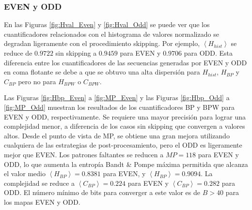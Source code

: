 \subsubsection{EVEN y ODD} \label{sssec:skipp}

En las Figuras \ref{fig:Hval_Even} y \ref{fig:Hval_Odd} se puede ver que los cuantificadores relacionados con el histograma de valores normalizado se degradan ligeramente con el procedimiento skipping.
Por ejemplo, $\left \langle H_{hist} \right \rangle$ se reduce de $0.9722$ sin skipping a $0.9459$ para EVEN y $0.9706$ para ODD.
Esta diferencia entre los cuantificadores de las secuencias generadas por EVEN y ODD en coma flotante se debe a que se obtuvo una alta dispersión para $H_{hist}$, $H_{BP}$ y $C_{BP}$ pero no para $H_{BPW}$ o $C_{BPW}$.

Las Figuras \ref{fig:Hbp_Even} a \ref{fig:MP_Even} y las Figuras \ref{fig:Hbp_Odd} a \ref{fig:MP_Odd} muestran los resultados de los cuantificadores BP y BPW para EVEN y ODD, respectivamente.
Se requiere una mayor precisión para lograr una complejidad menor, a diferencia de los casos sin skipping que convergen a valores altos.
Desde el punto de vista de MP, se obtiene una gran mejora utilizando cualquiera de las estrategias de post-procesamiento, pero el ODD es ligeramente mejor que EVEN.
Los patrones faltantes se reducen a $MP = 118$ para EVEN y ODD, lo que aumenta la entropía Bandt \& Pompe máxima permitida que alcanza el valor medio $\left \langle H_{BP} \right \rangle = 0.8381$ para EVEN, y $ \left \langle H_{BP} \right \rangle = 0.9094$.
La complejidad se reduce a $\left \langle C_{BP} \right \rangle = 0.224$ para EVEN y $\left \langle C_{BP} \right \rangle = 0.282$ para ODD.
El número mínimo de bits para converger a este valor es de $ B> 40 $ para los mapas EVEN y ODD.
%

